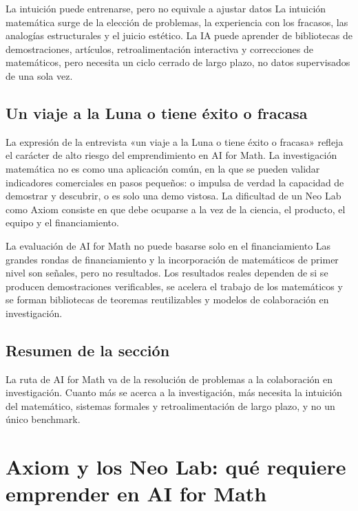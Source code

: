 \documentclass[a4paper]{article}
\begin{document}
\begin{knowledgebox}{La intuición puede entrenarse, pero no equivale a ajustar datos}
La intuición matemática surge de la elección de problemas, la experiencia con los fracasos, las analogías estructurales y el juicio estético. La IA puede aprender de bibliotecas de demostraciones, artículos, retroalimentación interactiva y correcciones de matemáticos, pero necesita un ciclo cerrado de largo plazo, no datos supervisados de una sola vez.
\end{knowledgebox}

\subsection{Un viaje a la Luna o tiene éxito o fracasa}

La expresión de la entrevista «un viaje a la Luna o tiene éxito o fracasa» refleja el carácter de alto riesgo del emprendimiento en AI for Math. La investigación matemática no es como una aplicación común, en la que se pueden validar indicadores comerciales en pasos pequeños: o impulsa de verdad la capacidad de demostrar y descubrir, o es solo una demo vistosa. La dificultad de un Neo Lab como Axiom consiste en que debe ocuparse a la vez de la ciencia, el producto, el equipo y el financiamiento.

\begin{warningbox}{La evaluación de AI for Math no puede basarse solo en el financiamiento}
Las grandes rondas de financiamiento y la incorporación de matemáticos de primer nivel son señales, pero no resultados. Los resultados reales dependen de si se producen demostraciones verificables, se acelera el trabajo de los matemáticos y se forman bibliotecas de teoremas reutilizables y modelos de colaboración en investigación.
\end{warningbox}

\subsection{Resumen de la sección}

La ruta de AI for Math va de la resolución de problemas a la colaboración en investigación. Cuanto más se acerca a la investigación, más necesita la intuición del matemático, sistemas formales y retroalimentación de largo plazo, y no un único benchmark.
\section{Axiom y los Neo Lab: qué requiere emprender en AI for Math}
\end{document}
